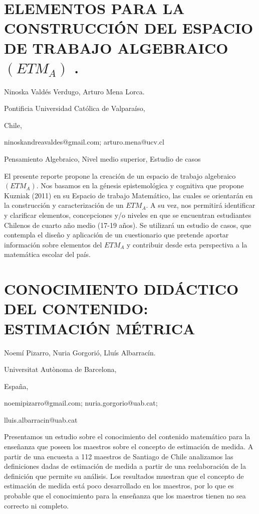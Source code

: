 \section{ELEMENTOS PARA LA CONSTRUCCIÓN DEL ESPACIO DE TRABAJO ALGEBRAICO$\left(ETM_{A}\right)$
.}

\begin{datos}

Ninoska Valdés Verdugo, Arturo Mena Lorca.

Pontificia Universidad Católica de Valparaíso,

Chile,

ninoskandreavaldes@gmail.com; arturo.mena@ucv.cl

\end{datos}

Pensamiento Algebraico, Nivel medio superior, Estudio de casos

El presente reporte propone la creación de un espacio de trabajo algebraico$\left(ETM_{A}\right)$.
Nos basamos en la génesis epistemológica y cognitiva que propone Kuzniak
(2011) en su Espacio de trabajo Matemático, las cuales se orientarán
en la construcción y caracterización de un $ETM_{A}$. A su vez, nos
permitirá identificar y clarificar elementos, concepciones y/o niveles
en que se encuentran estudiantes Chilenos de cuarto año medio (17-19
años). Se utilizará un estudio de casos, que contempla el diseño y
aplicación de un cuestionario que pretende aportar información sobre
elementos del $ETM_{A}$ y contribuir desde esta perspectiva a la
matemática escolar del país. 


\section{CONOCIMIENTO DIDÁCTICO DEL CONTENIDO: ESTIMACIÓN MÉTRICA }

\begin{datos}

Noemí Pizarro, Nuria Gorgorió, Lluís Albarracín.

Universitat Autònoma de Barcelona,

España,

noemipizarro@gmail.com; nuria.gorgorio@uab.cat;

lluis.albarracin@uab.cat 

\end{datos}

Presentamos un estudio sobre el conocimiento del contenido matemático
para la enseñanza que poseen los maestros sobre el concepto de estimación
de medida. A partir de una encuesta a 112 maestros de Santiago de
Chile analizamos las definiciones dadas de estimación de medida a
partir de una reelaboración de la definición que permite su análisis.
Los resultados muestran que el concepto de estimación de medida está
poco desarrollado en los maestros, por lo que es probable que el conocimiento
para la enseñanza que los maestros tienen no sea correcto ni completo. 


